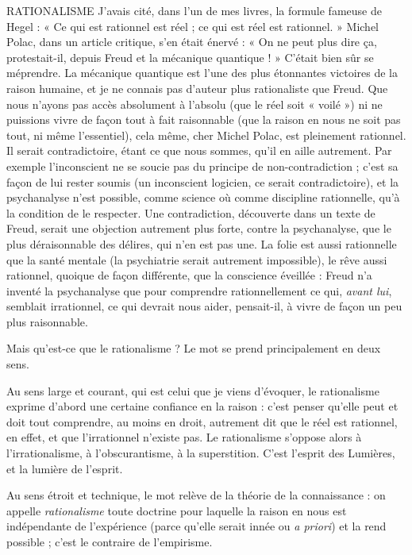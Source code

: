 RATIONALISME J'avais cité, dans l’un de mes livres, la formule fameuse de
Hegel : « Ce qui est rationnel est réel ; ce qui est réel est
rationnel. » Michel Polac, dans un article critique, s’en était énervé : « On ne
peut plus dire ça, protestait-il, depuis Freud et la mécanique quantique ! »
C'était bien sûr se méprendre. La mécanique quantique est l’une des plus étonnantes
victoires de la raison humaine, et je ne connais pas d’auteur plus rationaliste
que Freud. Que nous n’ayons pas accès absolument à l'absolu (que le
réel soit « voilé ») ni ne puissions vivre de façon tout à fait raisonnable (que la
raison en nous ne soit pas tout, ni même l'essentiel), cela même, cher Michel
Polac, est pleinement rationnel. Il serait contradictoire, étant ce que nous
sommes, qu’il en aille autrement. Par exemple l'inconscient ne se soucie pas du
principe de non-contradiction ; c’est sa façon de lui rester soumis (un inconscient
logicien, ce serait contradictoire), et la psychanalyse n’est possible,
comme science où comme discipline rationnelle, qu’à la condition de le respecter.
Une contradiction, découverte dans un texte de Freud, serait une objection
autrement plus forte, contre la psychanalyse, que le plus déraisonnable des
délires, qui n’en est pas une. La folie est aussi rationnelle que la santé mentale
(la psychiatrie serait autrement impossible), le rêve aussi rationnel, quoique de
façon différente, que la conscience éveillée : Freud n’a inventé la psychanalyse
que pour comprendre rationnellement ce qui, {\it avant lui}, semblait irrationnel, ce
qui devrait nous aider, pensait-il, à vivre de façon un peu plus raisonnable.

Mais qu'est-ce que le rationalisme ? Le mot se prend principalement en
deux sens.

Au sens large et courant, qui est celui que je viens d'évoquer, le rationalisme
exprime d’abord une certaine confiance en la raison : c’est penser qu’elle
peut et doit tout comprendre, au moins en droit, autrement dit que le réel est
rationnel, en effet, et que l’irrationnel n’existe pas. Le rationalisme s’oppose
alors à l’irrationalisme, à l’obscurantisme, à la superstition. C’est l'esprit des
Lumières, et la lumière de l'esprit.

Au sens étroit et technique, le mot relève de la théorie de la connaissance :
on appelle {\it rationalisme} toute doctrine pour laquelle la raison en nous est indépendante
de l'expérience (parce qu’elle serait innée ou {\it a priori}) et la rend
possible ; c’est le contraire de l’empirisme.


